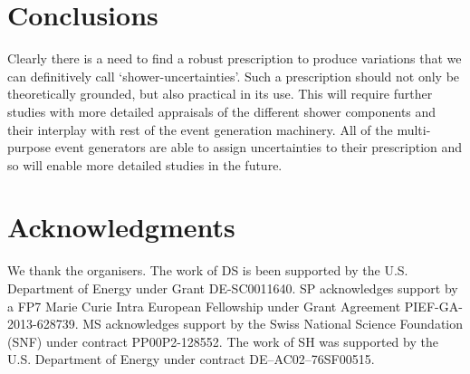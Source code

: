 \section{Conclusions}
\label{sec:psunc:conclusions}
Clearly there is a need to find a robust prescription to produce variations
that we can definitively call `shower-uncertainties'. Such a prescription
should not only be theoretically grounded, but also practical in its use. This
will require further studies with more detailed appraisals of the different
shower components and their interplay with rest of the event generation
machinery. All of the multi-purpose event generators are able to assign
uncertainties to their prescription and so will enable more detailed studies
in the future.

\section*{Acknowledgments}

We thank the organisers.  The work of DS is been supported by the
U.S. Department of Energy under Grant DE-SC0011640.  SP acknowledges support
by a FP7 Marie Curie Intra European Fellowship under Grant Agreement
PIEF-GA-2013-628739.  MS acknowledges support by the Swiss National Science
Foundation (SNF) under contract PP00P2-128552.  The work of SH was supported
by the U.S. Department of Energy under contract DE--AC02--76SF00515.
